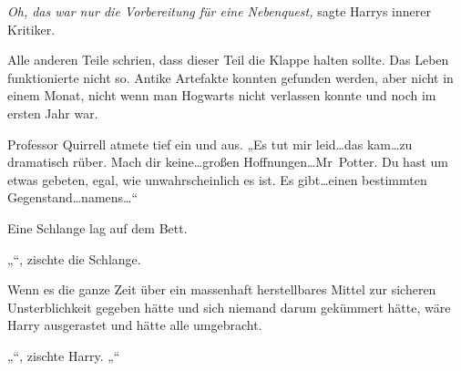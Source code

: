\emph{Oh, das war nur die Vorbereitung für eine Nebenquest,} sagte Harrys innerer Kritiker.

Alle anderen Teile schrien, dass dieser Teil die Klappe halten sollte. Das Leben funktionierte nicht so. Antike Artefakte konnten gefunden werden, aber nicht in einem Monat, nicht wenn man Hogwarts nicht verlassen konnte und noch im ersten Jahr war.

Professor Quirrell atmete tief ein und aus.
„Es tut mir leid…das kam…zu dramatisch rüber. Mach dir keine…großen Hoffnungen…Mr~Potter. Du hast um etwas gebeten, egal, wie unwahrscheinlich es ist. Es gibt…einen bestimmten Gegenstand…namens…“

Eine Schlange lag auf dem Bett.

„“, zischte die Schlange.

Wenn es die ganze Zeit über ein massenhaft herstellbares Mittel zur sicheren Unsterblichkeit gegeben hätte und sich niemand darum gekümmert hätte, wäre Harry ausgerastet und hätte alle umgebracht.

„“, zischte Harry. „“

